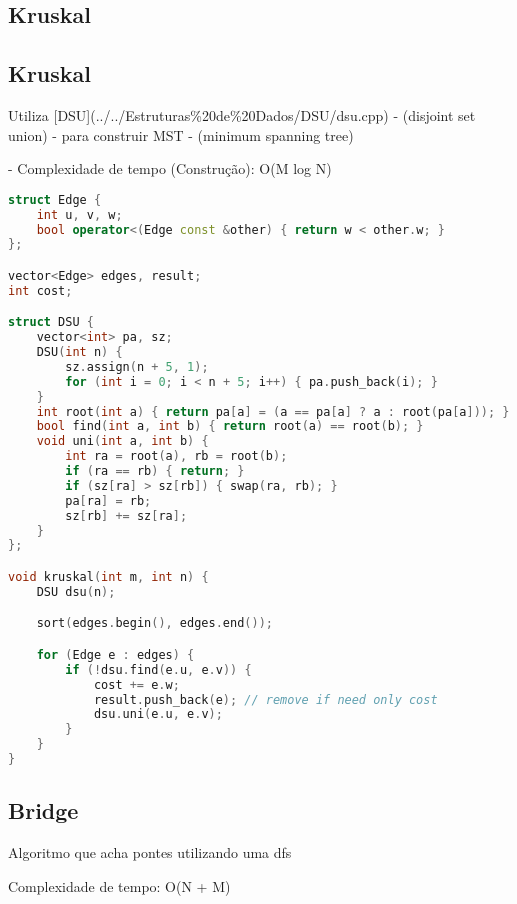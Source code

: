 \documentclass[11pt, a4paper, twoside]{article}
\begin{document}
\subsection{Kruskal}

\subsection{Kruskal}



Utiliza [DSU](../../Estruturas\%20de\%20Dados/DSU/dsu.cpp) - (disjoint set union) - para construir MST - (minimum spanning tree)

- Complexidade de tempo (Construção): O(M log N)

\begin{lstlisting}[language=C++]
struct Edge {
    int u, v, w;
    bool operator<(Edge const &other) { return w < other.w; }
};

vector<Edge> edges, result;
int cost;

struct DSU {
    vector<int> pa, sz;
    DSU(int n) {
        sz.assign(n + 5, 1);
        for (int i = 0; i < n + 5; i++) { pa.push_back(i); }
    }
    int root(int a) { return pa[a] = (a == pa[a] ? a : root(pa[a])); }
    bool find(int a, int b) { return root(a) == root(b); }
    void uni(int a, int b) {
        int ra = root(a), rb = root(b);
        if (ra == rb) { return; }
        if (sz[ra] > sz[rb]) { swap(ra, rb); }
        pa[ra] = rb;
        sz[rb] += sz[ra];
    }
};

void kruskal(int m, int n) {
    DSU dsu(n);

    sort(edges.begin(), edges.end());

    for (Edge e : edges) {
        if (!dsu.find(e.u, e.v)) {
            cost += e.w;
            result.push_back(e); // remove if need only cost
            dsu.uni(e.u, e.v);
        }
    }
}\end{lstlisting}

\subsection{Bridge}

Algoritmo que acha pontes utilizando uma dfs

Complexidade de tempo: O(N + M)
\end{document}
